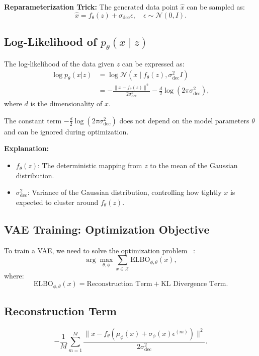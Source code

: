 \textbf{Reparameterization Trick:} The generated data point \( \widehat{x} \) can be sampled as:
\[
\widehat{x} = f_\theta(z) + \sigma_{\text{dec}} \epsilon, \quad \epsilon \sim \mathcal{N}(0, I).
\]

\subsection*{Log-Likelihood of \( p_\theta(x \mid z) \)}

The log-likelihood of the data given \( z \) can be expressed as:
\begin{align*}
  \log p_\theta(x|z) &= \log \mathcal{N}(x \mid f_\theta(z), \sigma_{\text{dec}}^2 I) \\
  &= - \frac{\|x - f_\theta(z)\|^2}{2 \sigma_{\text{dec}}^2} 
  - \frac{d}{2} \log(2\pi \sigma_{\text{dec}}^2),
\end{align*}
where \( d \) is the dimensionality of \( x \). 

The constant term \( -\frac{d}{2} \log(2\pi \sigma_{\text{dec}}^2) \) does not depend on the model parameters \( \theta \) and can be ignored during optimization.

\vspace{10pt}
\textbf{Explanation:}
\begin{itemize}
    \item \( f_\theta(z) \): The deterministic mapping from \( z \) to the mean of the Gaussian distribution.
    \item \( \sigma_{\text{dec}}^2 \): Variance of the Gaussian distribution, controlling how tightly \( x \) is expected to cluster around \( f_\theta(z) \).
\end{itemize}


\subsection{VAE Training: Optimization Objective}

To train a VAE, we need to solve the optimization problem ~\cite{chan2025tutorial}:
\[
\arg\max_{\theta, \phi} \sum_{x \in \mathcal{X}} \text{ELBO}_{\phi, \theta}(x),
\]
where:
\[
\text{ELBO}_{\phi, \theta}(x) = \text{Reconstruction Term} + \text{KL Divergence Term}.
\]

\subsection*{Reconstruction Term}
\[
- \frac{1}{M} \sum_{m=1}^M 
\frac{\|x - f_\theta\left(\mu_\phi(x) + \sigma_\phi(x)\epsilon^{(m)}\right)\|^2}{2\sigma_\text{dec}^2}.
\]

